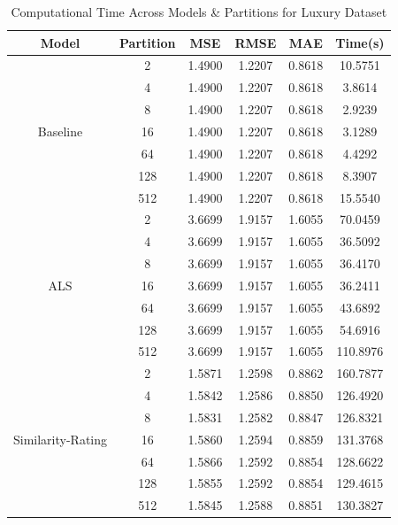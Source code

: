 \documentclass[sigconf,authorversion,nonacm]{acmart}
\begin{document}
\begin{table}
        \caption{Computational Time Across Models \& Partitions for Luxury Dataset}
        \label{tab:compute_luxury}
        \begin{tabular}{@{}cccccc@{}}
        \toprule
        \textbf{Model} & \textbf{Partition} & \textbf{MSE} & \textbf{RMSE} & \textbf{MAE} & \textbf{Time(s)}  \\
        \midrule
        \multirow{7}{*}{Baseline} & 2 & 1.4900 & 1.2207 & 0.8618 & 10.5751 \\
                 & 4 & 1.4900 & 1.2207 & 0.8618 & 3.8614 \\
                 & 8 & 1.4900 & 1.2207 & 0.8618 & 2.9239 \\
                 & 16 & 1.4900 & 1.2207 & 0.8618 & 3.1289 \\
                 & 64 & 1.4900 & 1.2207 & 0.8618 & 4.4292 \\
                 & 128 & 1.4900 & 1.2207 & 0.8618 & 8.3907 \\
                 & 512 & 1.4900 & 1.2207 & 0.8618 & 15.5540 \\\midrule
        \multirow{7}{*}{ALS} & 2 & 3.6699 & 1.9157 & 1.6055 & 70.0459 \\
                 & 4 & 3.6699 & 1.9157 & 1.6055 & 36.5092 \\
                 & 8 & 3.6699 & 1.9157 & 1.6055 & 36.4170 \\
                 & 16 & 3.6699 & 1.9157 & 1.6055 & 36.2411 \\
                 & 64 & 3.6699 & 1.9157 & 1.6055 & 43.6892 \\
                 & 128 & 3.6699 & 1.9157 & 1.6055 & 54.6916 \\
                 & 512 & 3.6699 & 1.9157 & 1.6055 & 110.8976 \\\midrule
        \multirow{7}{*}{Similarity-Rating} & 2 & 1.5871 & 1.2598 & 0.8862 & 160.7877 \\
                 & 4 & 1.5842 & 1.2586 & 0.8850 & 126.4920 \\
                 & 8 & 1.5831 & 1.2582 & 0.8847 & 126.8321 \\
                 & 16 & 1.5860 & 1.2594 & 0.8859 & 131.3768 \\
                 & 64 & 1.5866 & 1.2592 & 0.8854 & 128.6622 \\
                 & 128 & 1.5855 & 1.2592 &  0.8854 & 129.4615 \\
                 & 512 & 1.5845 & 1.2588 & 0.8851 & 130.3827 \\
        \bottomrule
        \end{tabular}
    \end{table}
    
\end{document}
